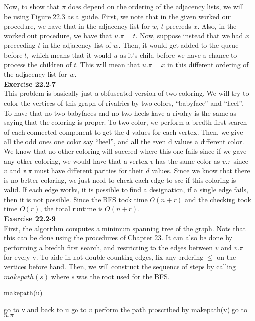 \documentclass{article}
\begin{document}
Now, to show that $\pi$ does depend on the ordering of the adjacency lists, we will be using Figure 22.3 as a guide. First, we note that in the given worked out procedure, we have that in the adjacency list for $w$, $t$ preceeds $x$. Also, in the worked out procedure, we have that $u.\pi = t$. Now, suppose instead that we had $x$ preceeding $t$ in the adjacency list of $w$. Then, it would get added to the queue before $t$, which means that it would $u$ as it's child before we have a chance to process the children of $t$. This will mean that $u.\pi = x$ in this different ordering of the adjacency list for $w$.\\

\noindent\textbf{Exercise 22.2-7}\\
This problem is basically just a obfuscated version of two coloring. We will try to color the vertices of this graph of rivalries by two colors, ``babyface'' and ``heel''. To have that no two babyfaces and no two heels have a rivalry is the same as saying that the coloring is proper. To two color, we perform a bredth first search of each connected component to get the d values for each vertex. Then, we give all the odd ones one color say ``heel'', and all the even d values a different color. We know that no other coloring will succeed where this one fails since if we gave any other coloring, we would have that a vertex $v$ has the same color as $v.\pi$ since $v$ and $v.\pi$ must have different parities for their $d$ values. Since we know that there is no better coloring, we just need to check each edge to see if this coloring is valid. If each edge works, it is possible to find a designation, if a single edge fails, then it is not possible. Since the BFS took time $O(n+r)$ and the checking took time $O(r)$, the total runtime is $O(n+r)$.\\

\noindent\textbf{Exercise 22.2-9}\\
First, the algorithm computes a minimum spanning tree of the graph. Note that this can be done using the procedures of Chapter 23. It can also be done by performing a bredth first search, and restricting to the edges between $v$ and $v.\pi$ for every v. To aide in not double counting edges, fix any ordering $\le$ on the vertices before hand. Then, we will construct the sequence of steps by calling $makepath(s)$ where $s$ was the root used for the BFS. 
\begin{algorithm}
\caption{makepath(u)}
\begin{algorithmic}
\State go to v and back to u
\EndFor
{}
\State go to $v$
\State perform the path proscribed by makepath(v)
\EndFor
\State go to $u.\pi$
\end{algorithmic}
\end{algorithm}
\end{document}
